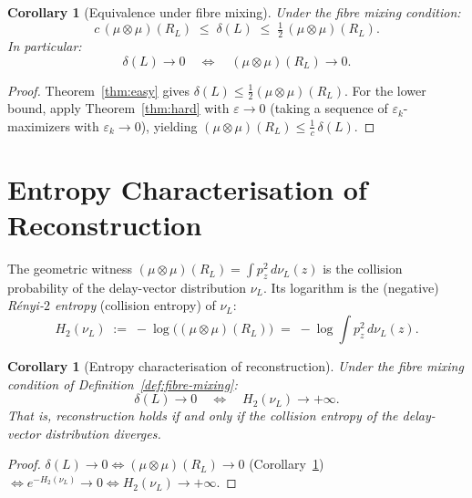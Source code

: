 \documentclass[11pt]{article}
\newtheorem{corollary}[theorem]{Corollary}
\theoremstyle{definition}
\newcommand{\RL}{R_L}
\newcommand{\dL}{\delta(L)}
\begin{document}
\begin{corollary}[Equivalence under fibre mixing]
\label{cor:equiv}
Under the fibre mixing condition:
\[
  c\,(\mu\otimes\mu)(\RL) \;\leq\; \dL \;\leq\; \tfrac{1}{2}\,(\mu\otimes\mu)(\RL).
\]
In particular:
\[
  \dL \to 0 \quad\iff\quad (\mu\otimes\mu)(\RL) \to 0.
\]
\end{corollary}

\begin{proof}
Theorem~\ref{thm:easy} gives $\dL \leq \tfrac{1}{2}(\mu\otimes\mu)(\RL)$.
For the lower bound, apply Theorem~\ref{thm:hard} with $\varepsilon \to 0$
(taking a sequence of $\varepsilon_k$-maximizers with $\varepsilon_k \to 0$),
yielding $(\mu\otimes\mu)(\RL) \leq \frac{1}{c}\,\dL$.
\end{proof}

\section{Entropy Characterisation of Reconstruction}

The geometric witness $(\mu\otimes\mu)(\RL) = \int p_z^2\,d\nu_L(z)$ is the
collision probability of the delay-vector distribution $\nu_L$.
Its logarithm is the (negative) \emph{Rényi-$2$ entropy} (collision entropy) of $\nu_L$:
\[
  H_2(\nu_L) \;:=\; -\log\bigl((\mu\otimes\mu)(\RL)\bigr)
  \;=\; -\log\!\int p_z^2\,d\nu_L(z).
\]

\begin{corollary}[Entropy characterisation of reconstruction]
\label{cor:entropy}
Under the fibre mixing condition of Definition~\ref{def:fibre-mixing}:
\[
  \dL \to 0
  \quad\iff\quad
  H_2(\nu_L) \to +\infty.
\]
That is, reconstruction holds if and only if the collision entropy of
the delay-vector distribution diverges.
\end{corollary}

\begin{proof}
$\dL \to 0 \iff (\mu\otimes\mu)(\RL) \to 0$ (Corollary~\ref{cor:equiv})
$\iff e^{-H_2(\nu_L)} \to 0 \iff H_2(\nu_L) \to +\infty$.
\end{proof}
\end{document}
